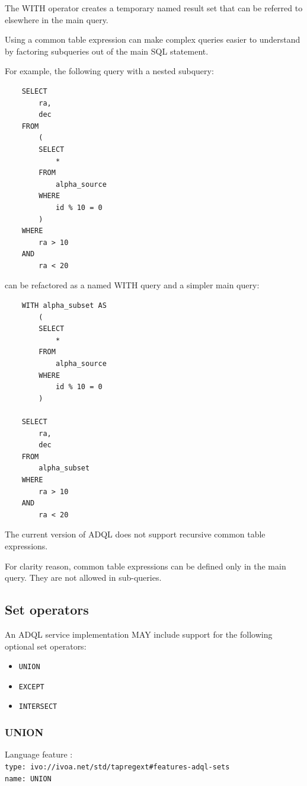 \documentclass[11pt,a4paper]{ivoa}
\begin{document}
The WITH operator creates a temporary named result set that can be referred
to elsewhere in the main query.

Using a common table expression can make complex queries easier to understand
by factoring subqueries out of the main SQL statement.

For example, the following query with a nested subquery:
\begin{verbatim}
    SELECT
        ra,
        dec
    FROM
        (
        SELECT
            *
        FROM
            alpha_source
        WHERE
            id % 10 = 0
        )
    WHERE
        ra > 10
    AND 
        ra < 20
\end{verbatim}
\noindent
can be refactored as a named WITH query and a simpler main query:
\begin{verbatim}
    WITH alpha_subset AS
        (
        SELECT
            *
        FROM
            alpha_source
        WHERE
            id % 10 = 0
        )

    SELECT
        ra,
        dec
    FROM
        alpha_subset
    WHERE
        ra > 10
    AND 
        ra < 20
\end{verbatim}

The current version of ADQL does not support recursive common table expressions.

For clarity reason, common table expressions can be defined only in the main
query. They are not allowed in sub-queries.

\subsection{Set operators}
\label{sec:set.operators}

An ADQL service implementation MAY include support for the following optional
set operators:

\begin{itemize}
    \item \verb:UNION:
    \item \verb:EXCEPT:
    \item \verb:INTERSECT:
\end{itemize}

\subsubsection{UNION}
{\footnotesize Language feature :}\\
{\footnotesize \verb|type: ivo://ivoa.net/std/tapregext#features-adql-sets|}\\
{\footnotesize \verb|name: UNION|}\\
\end{document}
